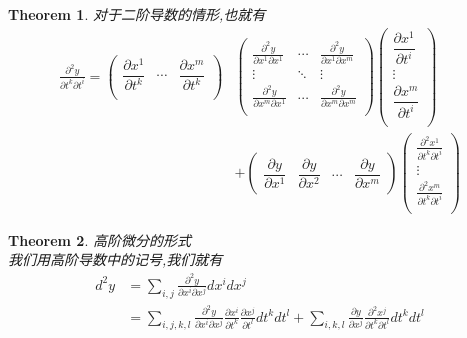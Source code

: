 \documentclass[11pt,hyperref,a4paper,UTF8]{ctexart}
\newtheorem{theorem}{Theorem}[subsection]
\begin{document}
\begin{CJK}{UTF8}{gkai}
\begin{theorem}
  对于二阶导数的情形,也就有
  \[
  \begin{aligned}
  \frac{\partial^2 y}{\partial t^k \partial t^i} = \begin{pmatrix}
    \dfrac{\partial x^1}{\partial t^k}&\cdots&\dfrac{\partial x^m}{\partial t^k}\\
  \end{pmatrix}&
  \begin{pmatrix}
    \frac{\partial^2 y}{\partial x^1 \partial x^1}&\cdots&\frac{\partial^2 y}{\partial x^1 \partial x^m}\\
    \vdots&\ddots&\vdots\\
    \frac{\partial^2 y}{\partial x^m \partial x^1}&\cdots&\frac{\partial^2 y}{\partial x^m \partial x^m}\\
  \end{pmatrix}
  \begin{pmatrix}
    \dfrac{\partial x^1}{\partial t^i}\\
    \vdots\\
    \dfrac{\partial x^m}{\partial t^i}\\
  \end{pmatrix}\\ &+ 
  \begin{pmatrix}
    \dfrac{\partial y}{\partial x^1}&\dfrac{\partial y}{\partial x^2}&\cdots&\dfrac{\partial y}{\partial x^m}
  \end{pmatrix}
  \begin{pmatrix}
    \frac{\partial^2 x^1}{\partial t^k \partial t^i}\\
    \vdots\\
    \frac{\partial^2 x^m}{\partial t^k \partial t^i}\\
  \end{pmatrix}
  \end{aligned}  
  \]
\end{theorem}

\begin{theorem}
  高阶微分的形式\\

  我们用高阶导数中的记号,我们就有
  \[\begin{aligned}
    d^2 y &= \sum_{i,j} \frac{\partial^2 y}{\partial x^i \partial x^j} d x^i d x^j\\
    &= \sum_{i,j,k,l} \frac{\partial^2 y}{\partial x^i \partial x^j} \frac{\partial x^i}{\partial t^k} \frac{\partial x^j}{\partial t^l} d t^k d t^l + \sum_{i,k,l} \frac{\partial y}{\partial x^j}\frac{\partial^2 x^j}{\partial t^k \partial t^l} d t^k d t^l\\
  \end{aligned}\]
\end{theorem}


\end{CJK}
\end{document}
